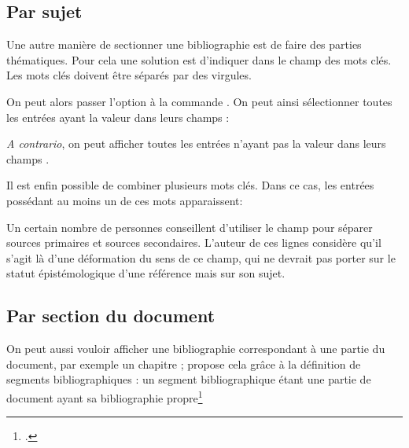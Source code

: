 \subsection{Par sujet}

Une autre manière de  sectionner une bibliographie est de faire des parties thématiques. Pour cela une solution est d'indiquer dans le champ   des mots clés. Les mots clés doivent être séparés par des virgules.

On peut alors passer l'option  à la commande . On peut ainsi sélectionner toutes les entrées ayant la valeur  dans leurs champs  :

\begin{latexcode}
\printbibliography[keyword=xxx]
\end{latexcode}

\emph{A contrario}, on peut afficher toutes les entrées n'ayant pas la valeur  dans leurs champs .

\begin{latexcode}
\printbibliography[notkeyword=xxx]
\end{latexcode}

Il est enfin possible de combiner plusieurs mots clés. Dans ce cas, les entrées possédant au moins un de ces mots apparaissent:

\begin{latexcode}
\printbibliography[keyword=positivistes, keyword=naturalistes]
\end{latexcode}

\begin{plusloins}
    Un certain nombre de personnes conseillent d'utiliser le champ  pour séparer sources primaires et sources secondaires. L'auteur de ces lignes considère qu'il s'agit là d'une déformation du sens de ce champ, qui ne devrait pas porter sur le statut épistémologique d'une référence mais sur son sujet. 
\end{plusloins}

\subsection{Par section du document}

On peut aussi vouloir afficher une bibliographie correspondant à une partie du document, par exemple un chapitre ;  propose cela grâce à la définition de segments bibliographiques : un segment bibliographique étant une partie de document ayant sa bibliographie propre\footcites[En réalité  propose deux choses différentes : \enquote{segment} et \enquote{section} bibliographique. Seules les sections bibliographiques ont réellement une bibliographie propre, dans la mesure où, si on utilise un style numéroté de bibliographie, la numérotation recommence à chaque changement de section, mais pas à chaque changement de segment. Toutefois il est rare en science humaine d'utiliser un style bibliographique numéroté. C'est pourquoi nous ne parlons ici que des segments bibliographiques et non pas des sections bibliographiques. Voir :][]{biblatex_section}{biblatex_segment}

